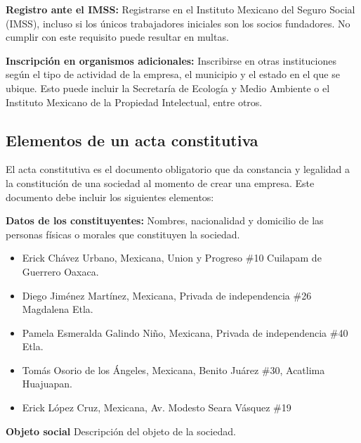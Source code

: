 \textbf{Registro ante el IMSS:}
Registrarse en el Instituto Mexicano del Seguro Social (IMSS), incluso si los únicos trabajadores iniciales son los socios fundadores. No cumplir con este requisito puede resultar en multas.

\textbf{Inscripción en organismos adicionales:}
Inscribirse en otras instituciones según el tipo de actividad de la empresa, el municipio y el estado en el que se ubique. Esto puede incluir la Secretaría de Ecología y Medio Ambiente o el Instituto Mexicano de la Propiedad Intelectual, entre otros.


\subsection{Elementos de un acta constitutiva}
El acta constitutiva es el documento obligatorio que da constancia y legalidad a la constitución de una sociedad al momento de crear una empresa. Este documento debe incluir los siguientes elementos:

\textbf{Datos de los constituyentes:}
Nombres, nacionalidad y domicilio de las personas físicas o morales que constituyen la sociedad.

\begin{itemize}
    \item Erick Chávez Urbano, Mexicana, Union y Progreso \#10 Cuilapam de Guerrero Oaxaca.
    \item Diego Jiménez Martínez, Mexicana, Privada de independencia \#26 Magdalena Etla.
    \item Pamela Esmeralda Galindo Niño, Mexicana, Privada de independencia \#40 Etla.
    \item Tomás Osorio de los Ángeles, Mexicana, Benito Juárez \#30, Acatlima Huajuapan.
    \item Erick López Cruz, Mexicana, Av. Modesto Seara Vásquez \#19
\end{itemize}

\textbf{Objeto social}
Descripción del objeto de la sociedad.


